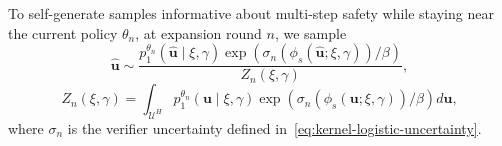\documentclass[letterpaper, 10 pt, conference]{ieeeconf}
\begin{document}


To self-generate samples informative about multi-step safety while staying near the current policy \(\theta_n\), at expansion round \(n\),
we sample
\begin{equation}
\hat{\mathbf u}
\sim
\frac{
p_1^{\theta_n}(\hat{\mathbf u}\mid\xi,\gamma)
\exp\!\left(
\sigma_n\!\left(\phi_s(\hat{\mathbf u};\xi,\gamma)\right)/\beta
\right)
}{
Z_n(\xi,\gamma)
},
\label{eq:importancesampling}
\end{equation}
\begin{equation}
Z_n(\xi,\gamma)
=
\int_{\mathcal U^H}
p_1^{\theta_n}(\mathbf u\mid\xi,\gamma)
\exp\!\left(
\sigma_n\!\left(\phi_s(\mathbf u;\xi,\gamma)\right)/\beta
\right)
d\mathbf u,
\end{equation}
where \(\sigma_n\) is the verifier uncertainty defined
in~\eqref{eq:kernel-logistic-uncertainty}.
\end{document}
